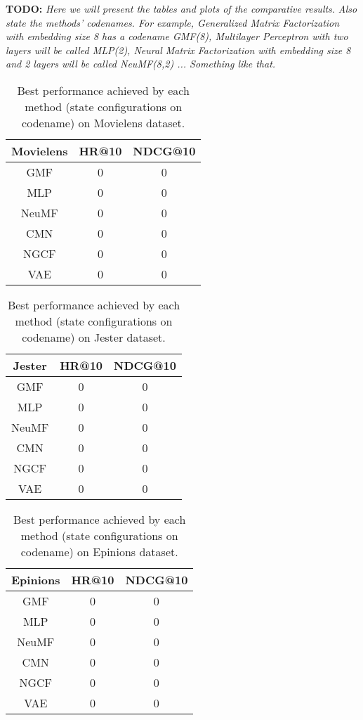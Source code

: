 \textbf{TODO: }
\textit{Here we will present the tables and plots of the comparative results.}
\textit{Also state the methods' codenames. For example, Generalized Matrix Factorization with embedding size 8 has a codename GMF(8), Multilayer Perceptron with two layers will be called MLP(2), Neural Matrix Factorization with embedding size 8 and 2 layers will be called NeuMF(8,2) ... Something like that.}
\begin{table}[h]
    \centering
    \begin{tabular}{c|c|c}
        \hline
        Movielens & HR@10 & NDCG@10 \\
        \hline
        GMF   & 0 & 0 \\
        MLP   & 0 & 0 \\
        NeuMF & 0 & 0 \\
        CMN   & 0 & 0 \\
        NGCF  & 0 & 0 \\
        VAE   & 0 & 0
    \end{tabular}
    \caption{Best performance achieved by each method (state configurations on codename) on Movielens dataset.}
    \label{tab:movielens}
\end{table}

\begin{table}[h]
    \centering
    \begin{tabular}{c|c|c}
        \hline
        Jester & HR@10 & NDCG@10 \\
        \hline
        GMF   & 0 & 0 \\
        MLP   & 0 & 0 \\
        NeuMF & 0 & 0 \\
        CMN   & 0 & 0 \\
        NGCF  & 0 & 0 \\
        VAE   & 0 & 0
    \end{tabular}
    \caption{Best performance achieved by each method (state configurations on codename) on Jester dataset.}
    \label{tab:jester}
\end{table}

\begin{table}[h]
    \centering
    \begin{tabular}{c|c|c}
        \hline
        Epinions & HR@10 & NDCG@10 \\
        \hline
        GMF   & 0 & 0 \\
        MLP   & 0 & 0 \\
        NeuMF & 0 & 0 \\
        CMN   & 0 & 0 \\
        NGCF  & 0 & 0 \\
        VAE   & 0 & 0
    \end{tabular}
    \caption{Best performance achieved by each method (state configurations on codename) on Epinions dataset.}
    \label{tab:epinions}
\end{table}

